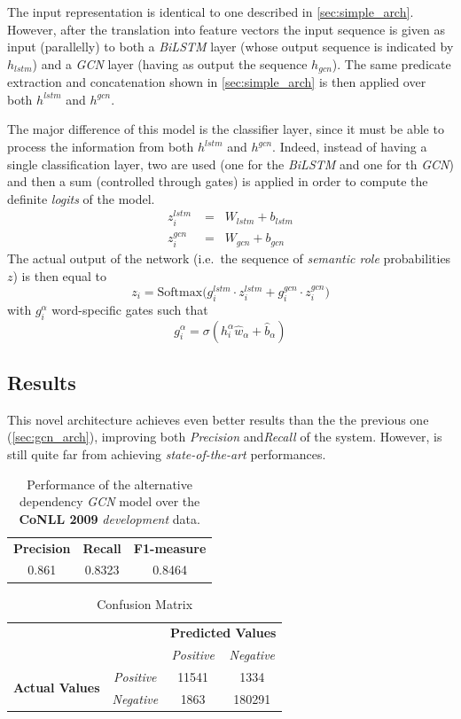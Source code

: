 \documentclass[a4paper,10pt,twocolumn]{article}
\newcommand{\BiLSTM}{\emph{BiLSTM}}
\newcommand{\GCN}{\emph{GCN}}
\begin{document}
 The input representation is identical to one described in \cref{sec:simple_arch}. However, after the  translation into feature vectors the input sequence is given as input (parallelly) to both a \BiLSTM{} layer (whose output sequence is indicated by $h_{lstm}$) and a \GCN{} layer (having as output the sequence $h_{gcn}$). The same predicate extraction and concatenation shown in \cref{sec:simple_arch} is then applied over both $h^{lstm}$ and $h^{gcn}$.
 
 The major difference of this model is the classifier layer, since it must be able to process the information from both $h^{lstm}$ and $h^{gcn}$.
 Indeed, instead of having a single classification layer, two are used (one for the \BiLSTM{} and one for th \GCN{}) and then a sum (controlled through gates) is applied in order to compute the definite \emph{logits} of the model.
 \begin{align*}
 z^{lstm}_i &= \mathop{h^{lstm}_i} W_{lstm} + b_{lstm}\\
 z^{gcn}_i &= \mathop{h^{gcn}_i} W_{gcn} + b_{gcn}
 \end{align*}
  The actual output of the network (i.e.\ the sequence of \emph{semantic role} probabilities $z$) is then equal to
 $$
 z_i = \mathrm{Softmax}\big(g^{lstm}_{i}\cdot z^{lstm}_i + g^{gcn}_{i}\cdot z^{gcn}_i\big)
 $$
 with  $g^{\alpha}_{i}$ word-specific gates such that 
 $$
 g^{\alpha}_{i} = \sigma ( h^\alpha_i \hat w_\alpha  + \hat b_\alpha)
 $$

\subsection{Results}
This novel architecture achieves even better results than the the previous one (\cref{sec:gcn_arch}), improving both \emph{Precision} and\emph {Recall} of the system. However, is still quite far from achieving \emph{state-of-the-art} performances.
\begin{table}[h!]
	\centering
	\begin{tabular}{|c|c|c|}
		\hline\hline
		\textbf{Precision} & \textbf{Recall}&\textbf{F1-measure}\\
		0.861 & 0.8323 &0.8464\\
		\hline\hline
	\end{tabular}
	\caption{Performance of the alternative dependency \GCN{} model over the \textbf{CoNLL 2009} \emph{development} data.}
	\label{tab:alt_perf}
\end{table}

\begin{table}[h!]
	\centering
	\begin{tabular}{cccc}
		&&\multicolumn{2}{c}{\textbf{Predicted Values}}\\
		& &\textit{Positive}&\textit{Negative}\\\cline{3-4}	
		\multirow{2}{1.1cm}{\textbf{Actual Values}} 
		& \textit{Positive}  &\multicolumn{1}{|c|}{11541} & \multicolumn{1}{|c|}{1334}\\\cline{3-4}
		& \textit{Negative} & \multicolumn{1}{|c|}{1863} & \multicolumn{1}{|c|}{180291}\\\cline{3-4}
	\end{tabular}
	\caption{Confusion Matrix}
\end{table}



\end{document}

